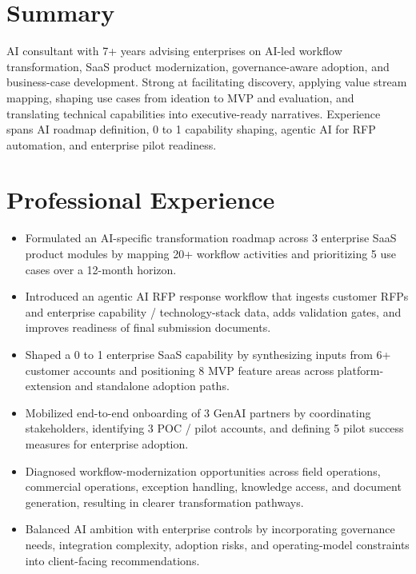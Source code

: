 \documentclass[10pt]{article}
\begin{document}
\fontsize{9.8pt}{11.7pt}\selectfont


\section{Summary}
AI consultant with 7+ years advising enterprises on AI-led workflow transformation, SaaS product modernization, governance-aware adoption, and business-case development. Strong at facilitating discovery, applying value stream mapping, shaping use cases from ideation to MVP and evaluation, and translating technical capabilities into executive-ready narratives. Experience spans AI roadmap definition, 0 to 1 capability shaping, agentic AI for RFP automation, and enterprise pilot readiness.

\section{Professional Experience}
\begin{itemize}
  \item Formulated an AI-specific transformation roadmap across 3 enterprise SaaS product modules by mapping 20+ workflow activities and prioritizing 5 use cases over a 12-month horizon.
  \item Introduced an agentic AI RFP response workflow that ingests customer RFPs and enterprise capability / technology-stack data, adds validation gates, and improves readiness of final submission documents.
  \item Shaped a 0 to 1 enterprise SaaS capability by synthesizing inputs from 6+ customer accounts and positioning 8 MVP feature areas across platform-extension and standalone adoption paths.
  \item Mobilized end-to-end onboarding of 3 GenAI partners by coordinating stakeholders, identifying 3 POC / pilot accounts, and defining 5 pilot success measures for enterprise adoption.
  \item Diagnosed workflow-modernization opportunities across field operations, commercial operations, exception handling, knowledge access, and document generation, resulting in clearer transformation pathways.
  \item Balanced AI ambition with enterprise controls by incorporating governance needs, integration complexity, adoption risks, and operating-model constraints into client-facing recommendations.
\end{itemize}
\end{document}
